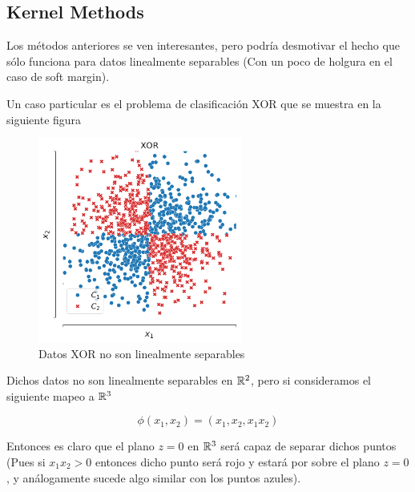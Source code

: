 \subsection{Kernel Methods}

Los métodos anteriores se ven interesantes, pero podría desmotivar el hecho que sólo funciona para datos linealmente separables (Con un poco de holgura en el caso de soft margin). 

Un caso particular es el problema de clasificación XOR que se muestra en la siguiente figura

\begin{figure}[ht]
    \centering
    \includegraphics[width=0.6\textwidth]{img/cap5_xor}
    \caption{Datos XOR no son linealmente separables}
    \label{fig:my_label5}
\end{figure}

Dichos datos no son linealmente separables en ${\mathbb R}^2$, pero si consideramos el siguiente mapeo a ${\mathbb R}^3$

\begin{equation}
    \phi(x_1, x_2) = (x_1, x_2, x_1 x_2)
\end{equation}

Entonces es claro que el plano $z=0$ en ${\mathbb R}^3$ será capaz de separar dichos puntos (Pues si $x_1 x_2 > 0$ entonces dicho punto será rojo y estará por sobre el plano $z=0$, y análogamente sucede algo similar con los puntos azules). 

